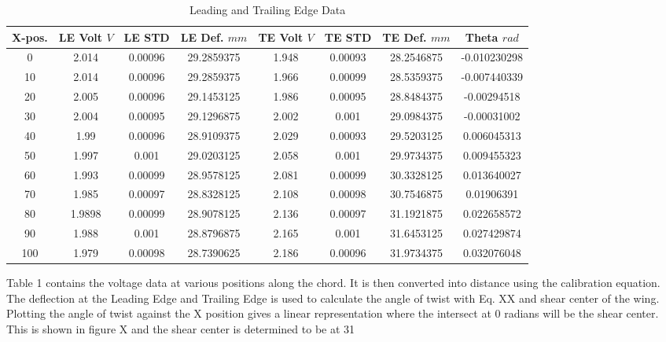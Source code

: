 \documentclass{article}
\begin{document}
\begin{table}[hbtp]
  \centering
  \begin{tabular}{|c|c|c|c|c|c|c|c|}
  \hline
  X-pos. & LE Volt \(V\) & LE STD & LE Def. \(mm\) & TE Volt \(V\) & TE STD & TE Def. \(mm\) & Theta \(rad\) \\
  \hline
  0 & 2.014 & 0.00096 & 29.2859375 & 1.948 & 0.00093 & 28.2546875 & -0.010230298 \\
  10 & 2.014 & 0.00096 & 29.2859375 & 1.966 & 0.00099 & 28.5359375 & -0.007440339 \\
  20 & 2.005 & 0.00096 & 29.1453125 & 1.986 & 0.00095 & 28.8484375 & -0.00294518 \\
  30 & 2.004 & 0.00095 & 29.1296875 & 2.002 & 0.001 & 29.0984375 & -0.00031002 \\
  40 & 1.99 & 0.00096 & 28.9109375 & 2.029 & 0.00093 & 29.5203125 & 0.006045313 \\
  50 & 1.997 & 0.001 & 29.0203125 & 2.058 & 0.001 & 29.9734375 & 0.009455323 \\
  60 & 1.993 & 0.00099 & 28.9578125 & 2.081 & 0.00099 & 30.3328125 & 0.013640027 \\
  70 & 1.985 & 0.00097 & 28.8328125 & 2.108 & 0.00098 & 30.7546875 & 0.01906391 \\
  80 & 1.9898 & 0.00099 & 28.9078125 & 2.136 & 0.00097 & 31.1921875 & 0.022658572 \\
  90 & 1.988 & 0.001 & 28.8796875 & 2.165 & 0.001 & 31.6453125 & 0.027429874 \\
  100 & 1.979 & 0.00098 & 28.7390625 & 2.186 & 0.00096 & 31.9734375 & 0.032076048 \\
  \hline
  \end{tabular}
  \caption{Leading and Trailing Edge Data}
  \label{tab:LE_TE_Data}
\end{table}

Table 1 contains the voltage data at various positions along the chord.  It is then converted into distance using the calibration equation.  The deflection at the Leading Edge and Trailing Edge is used to calculate the angle of twist with Eq. XX %
and shear center of the wing.  Plotting the angle of twist against the X position gives a linear representation where the intersect at 0 radians will be the shear center.  This is shown in figure X %
and the shear center is determined to be at 31%
\end{document}
